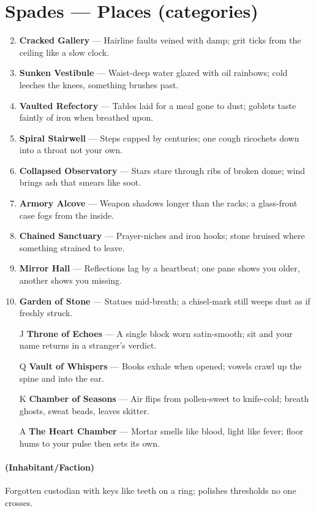 \section*{Spades --- Places (categories)}
\label{sec:dungeon-places}
\begin{enumerate}
\setcounter{enumi}{1}
\item \textbf{Cracked Gallery} --- Hairline faults veined with damp; grit ticks from the ceiling like a slow clock.
\item \textbf{Sunken Vestibule} --- Waist-deep water glazed with oil rainbows; cold leeches the knees, something brushes past.
\item \textbf{Vaulted Refectory} --- Tables laid for a meal gone to dust; goblets taste faintly of iron when breathed upon.
\item \textbf{Spiral Stairwell} --- Steps cupped by centuries; one cough ricochets down into a throat not your own.
\item \textbf{Collapsed Observatory} --- Stars stare through ribs of broken dome; wind brings ash that smears like soot.
\item \textbf{Armory Alcove} --- Weapon shadows longer than the racks; a glass-front case fogs from the inside.
\item \textbf{Chained Sanctuary} --- Prayer-niches and iron hooks; stone bruised where something strained to leave.
\item \textbf{Mirror Hall} --- Reflections lag by a heartbeat; one pane shows you older, another shows you missing.
\item \textbf{Garden of Stone} --- Statues mid-breath; a chisel-mark still weeps dust as if freshly struck.
\item[J] \textbf{Throne of Echoes} --- A single block worn satin-smooth; sit and your name returns in a stranger's verdict.
\item[Q] \textbf{Vault of Whispers} --- Books exhale when opened; vowels crawl up the spine and into the ear.
\item[K] \textbf{Chamber of Seasons} --- Air flips from pollen-sweet to knife-cold; breath ghosts, sweat beads, leaves skitter.
\item[A] \textbf{The Heart Chamber} --- Mortar smells like blood, light like fever; floor hums to your pulse then sets its own.
\end{enumerate}

\paragraph*{(Inhabitant/Faction)} Forgotten custodian with keys like teeth on a ring; polishes thresholds no one crosses.

